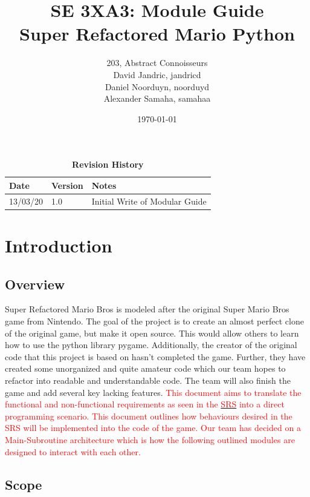 \documentclass[12pt, titlepage]{article}
\title{SE 3XA3: Module Guide\\Super Refactored Mario Python}
\author{203, Abstract Connoisseurs 
		\\ David Jandric, jandricd
		\\ Daniel Noorduyn, noorduyd
		\\ Alexander Samaha, samahaa
}
\date{\today}
\begin{document}
\maketitle

\tableofcontents
\listoftables
\listoffigures

\begin{table}[btp]
\caption{\bf Revision History}
\begin{tabularx}{\textwidth}{p{3cm}p{2cm}X}
\toprule {\bf Date} & {\bf Version} & {\bf Notes}\\
\midrule
13/03/20 & 1.0 & Initial Write of Modular Guide\\
\bottomrule
\end{tabularx}
\end{table}

\clearpage


\section{Introduction}

\subsection{Overview}

Super Refactored Mario Bros is modeled after the original Super Mario Bros game from Nintendo. The goal of the project is to create an almost perfect clone of the original game, but make it open source. This would allow others to learn how to use the python library pygame. Additionally, the creator of the original code that this project is based on hasn't completed the game. Further, they have created some unorganized and quite amateur code which our team hopes to refactor into readable and understandable code. The team will also finish the game and add several key lacking features. \textcolor{red}{This document aims to translate the functional and non-functional requirements as seen in the \href{https://gitlab.cas.mcmaster.ca/jandric/super-refactored-mario-bros/-/blob/master/Doc/SRS/SRS.pdf}{\textcolor{red}{SRS}} into a direct programming scenario. This document outlines how behaviours desired in the SRS will be implemented into the code of the game. Our team has decided on a Main-Subroutine architecture which is how the following outlined modules are designed to interact with each other.}

\subsection{Scope}
\end{document}
